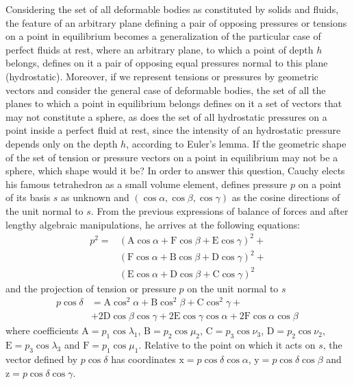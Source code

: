 Considering the set of all deformable bodies as constituted by solids and fluids, the feature of an arbitrary plane defining a pair of opposing pressures or tensions on a point in equilibrium becomes a generalization of the particular case of perfect fluids at rest, where an arbitrary plane, to which a point of depth $h$ belongs, defines on it a pair of opposing equal pressures normal to this plane (hydrostatic). Moreover, if we represent tensions or pressures by geometric vectors and consider the general case of deformable bodies, the set of all the planes to which a point in equilibrium belongs defines on it a set of vectors that may not constitute a sphere, as does the set of all hydrostatic pressures on a point inside a perfect fluid at rest, since the intensity of an hydrostatic pressure depends only on the depth $h$, according to Euler's lemma. If the geometric shape of the set of tension or pressure vectors on a point in equilibrium may not be a sphere, which shape would it be? In order to answer this question, Cauchy elects his famous tetrahedron as a small volume element, defines pressure $p$ on a point of its basis $s$ as unknown and $(\cos\alpha,\cos\beta,\cos\gamma)$ as the cosine directions of the unit normal to $s$. From the previous expressions of balance of forces and after lengthy algebraic manipulations, he arrives at the following equations:
\begin{align*}
p^2 = &(\text{A}\cos\alpha+\text{F}\cos\beta+\text{E}\cos\gamma)^2+\\
&(\text{F}\cos\alpha+\text{B}\cos\beta+\text{D}\cos\gamma)^2+\\
&(\text{E}\cos\alpha+\text{D}\cos\beta+\text{C}\cos\gamma)^2
\end{align*}
and the projection of tension or pressure $p$ on the unit normal to $s$ 
\begin{align*}
p\cos\delta &= \text{A}\cos^2\alpha+\text{B}\cos^2\beta+\text{C}\cos^2\gamma+\\
&+2\text{D}\cos\beta\cos\gamma +2\text{E}\cos\gamma\cos\alpha+2\text{F}\cos\alpha\cos\beta\,
\end{align*}
where coefficients $\text{A} = p_1\cos\lambda_1$, $\text{B} = p_2\cos\mu_2$, $\text{C} = p_3\cos\nu_3$, $\text{D} = p_2\cos\nu_2$, $\text{E} = p_3\cos\lambda_3$ and $\text{F} = p_1\cos\mu_1$. Relative to the point on which it acts on $s$, the vector defined by $p\cos\delta$  has coordinates $\text{x}=p\cos\delta\cos\alpha$, $\text{y}=p\cos\delta\cos\beta$ and $\text{z}=p\cos\delta\cos\gamma$.    


 


